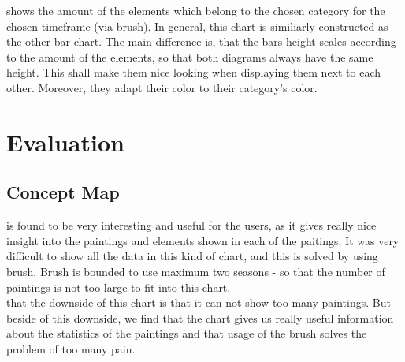 \documentclass[a4paper]{tufte-book}
\begin{document}
 shows the amount of the elements which belong to the chosen category for the chosen timeframe (via brush). In general, this chart is similiarly constructed as the other bar chart. The main difference is, that the bars height scales according to the amount of the elements, so that both diagrams always have the same height. This shall make them nice looking when displaying them next to each other. Moreover, they adapt their color to their category's color. \\

\chapter{Evaluation}
\section{Concept Map}
 is found to be very interesting and useful for the users, as it gives really nice insight into the paintings and elements shown in each of the paitings. It was very difficult to show all the data in this kind of chart, and this is solved by using brush. Brush is bounded to use maximum two seasons - so that the number of paintings is not too large to fit into this chart.\\
 that the downside of this chart is that it can not show too many paintings. But beside of this downside, we find that the chart gives us really useful information about the statistics of the paintings and that usage of the brush solves the problem of too many pain. \\
\end{document}
